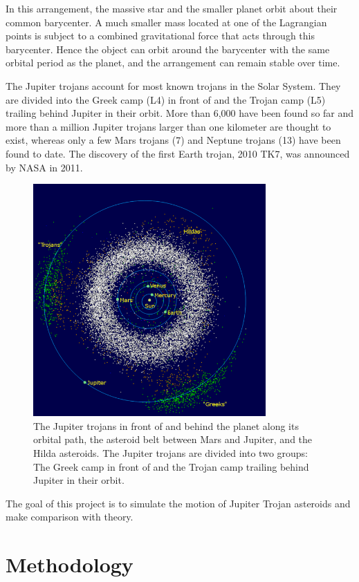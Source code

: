 \documentclass[12pt,a4paper]{article}
\begin{document}
In this arrangement, the massive star and the smaller planet orbit about their common barycenter. A much smaller mass located at one of the Lagrangian points is subject to a combined gravitational force that acts through this barycenter. Hence the object can orbit around the barycenter with the same orbital period as the planet, and the arrangement can remain stable over time.

The Jupiter trojans account for most known trojans in the Solar System. They are divided into the Greek camp (L4) in front of and the Trojan camp (L5) trailing behind Jupiter in their orbit. More than 6,000 have been found so far and more than a million Jupiter trojans larger than one kilometer are thought to exist, whereas only a few Mars trojans (7) and Neptune trojans (13) have been found to date. The discovery of the first Earth trojan, 2010 TK7, was announced by NASA in 2011.

\begin{figure}[H]
\centering
\includegraphics[width=3.5in]{600px-InnerSolarSystem-en.png}
\caption{The Jupiter trojans in front of and behind the planet along its orbital path, the asteroid belt between Mars and Jupiter, and the Hilda asteroids. The Jupiter trojans are divided into two groups: The Greek camp in front of and the Trojan camp trailing behind Jupiter in their orbit.}
\end{figure}

The goal of this project is to simulate the motion of Jupiter Trojan asteroids and make comparison with theory.


\section{Methodology}
\end{document}
